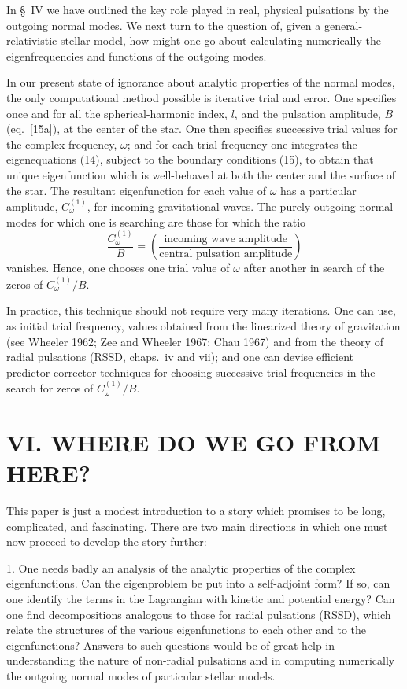 \documentclass[12pt]{article}
\begin{document}
In \S~IV we have outlined the key role played in real, physical pulsations by the outgoing normal modes. We next turn to the question of, given a general-relativistic stellar model, how might one go about calculating numerically the eigenfrequencies and functions of the outgoing modes.

In our present state of ignorance about analytic properties of the normal modes, the only computational method possible is iterative trial and error. One specifies once and for all the spherical-harmonic index, $l$, and the pulsation amplitude, $B$ (eq.\ [15a]), at the center of the star. One then specifies successive trial values for the complex frequency, $\omega$; and for each trial frequency one integrates the eigenequations (14), subject to the boundary conditions (15), to obtain that unique eigenfunction which is well-behaved at both the center and the surface of the star. The resultant eigenfunction for each value of $\omega$ has a particular amplitude, $C_\omega^{(1)}$, for incoming gravitational waves. The purely outgoing normal modes for which one is searching are those for which the ratio
%
\begin{equation}
\frac{C_\omega^{(1)}}{B} =
\left(\frac{\text{incoming wave amplitude}}{\text{central pulsation amplitude}}\right)
\tag{35}
\end{equation}
%
vanishes. Hence, one chooses one trial value of $\omega$ after another in search of the zeros of $C_\omega^{(1)}/B$.

In practice, this technique should not require very many iterations. One can use, as initial trial frequency, values obtained from the linearized theory of gravitation (see Wheeler 1962; Zee and Wheeler 1967; Chau 1967) and from the theory of radial pulsations (RSSD, chaps.\ iv and vii); and one can devise efficient predictor-corrector techniques for choosing successive trial frequencies in the search for zeros of $C_\omega^{(1)}/B$.

\section*{VI. WHERE DO WE GO FROM HERE?}

This paper is just a modest introduction to a story which promises to be long, complicated, and fascinating. There are two main directions in which one must now proceed to develop the story further:

1. One needs badly an analysis of the analytic properties of the complex eigenfunctions. Can the eigenproblem be put into a self-adjoint form? If so, can one identify the terms in the Lagrangian with kinetic and potential energy? Can one find decompositions analogous to those for radial pulsations (RSSD), which relate the structures of the various eigenfunctions to each other and to the eigenfunctions? Answers to such questions would be of great help in understanding the nature of non-radial pulsations and in computing numerically the outgoing normal modes of particular stellar models.
\end{document}
